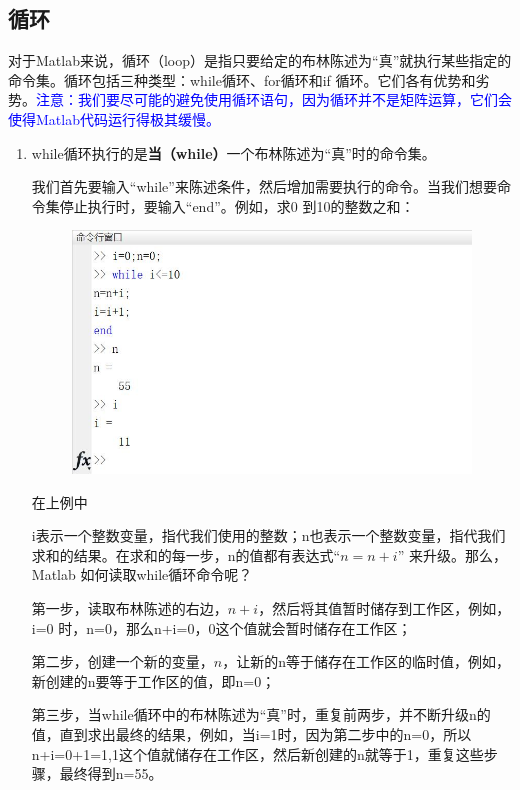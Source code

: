 \documentclass[cn,10pt,math=newtx,citestyle=gb7714-2015,bibstyle=gb7714-2015]{elegantbook}
\begin{document}
{{	\subsection{循环}
	
	对于Matlab来说，循环（loop）是指只要给定的布林陈述为“真”就执行某些指定的命令集。循环包括三种类型：while循环、for循环和if 循环。它们各有优势和劣势。\textcolor{blue}{注意：我们要尽可能的避免使用循环语句，因为循环并不是矩阵运算，它们会使得Matlab代码运行得极其缓慢。}
	
	\begin{enumerate}
		\item while循环执行的是\textbf{当（while）}一个布林陈述为“真”时的命令集。
		
		我们首先要输入“while”来陈述条件，然后增加需要执行的命令。当我们想要命令集停止执行时，要输入“end”。例如，求0 到10的整数之和：
		
		\begin{figure}[htbp!]
			\centering
			\includegraphics[width=0.8\linewidth]{FIG/integersum}
			\centering
		\end{figure}
		
		在上例中
		
		i表示一个整数变量，指代我们使用的整数；n也表示一个整数变量，指代我们求和的结果。在求和的每一步，n的值都有表达式“$n=n+i$” 来升级。那么，Matlab 如何读取while循环命令呢？
		
		第一步，读取布林陈述的右边，$n+i$，然后将其值暂时储存到工作区，例如，i=0 时，n=0，那么n+i=0，0这个值就会暂时储存在工作区；
		
		第二步，创建一个新的变量，$n$，让新的n等于储存在工作区的临时值，例如，新创建的n要等于工作区的值，即n=0；
		
		第三步，当while循环中的布林陈述为“真”时，重复前两步，并不断升级n的值，直到求出最终的结果，例如，当i=1时，因为第二步中的n=0，所以n+i=0+1=1,1这个值就储存在工作区，然后新创建的n就等于1，重复这些步骤，最终得到n=55。
		

\end{enumerate}}}
\end{document}
